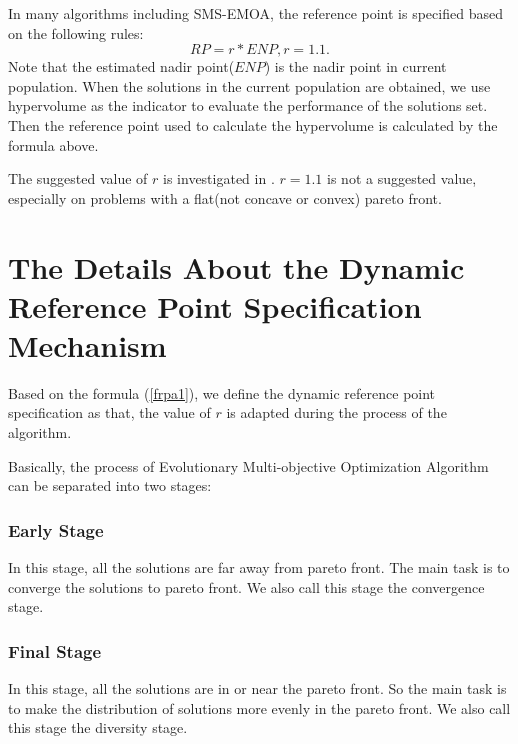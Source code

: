 \documentclass[conference]{IEEEtran}
\begin{document}
In many algorithms including SMS-EMOA\cite{smsemoa}, 
the reference point is specified based on the following rules:
\begin{equation}\label{frpa1}
  RP = r * ENP, r = 1.1.
\end{equation}
Note that the estimated nadir point($ENP$) is the nadir point in current population.
When the solutions in the current population are obtained, 
we use hypervolume as the indicator to evaluate the performance of the solutions set. 
Then the reference point used to calculate the hypervolume is calculated by the formula above.

The suggested value of $r$ is investigated in \cite{hisao:RPexplanation, hisao:RPhowtoSpecify, hisao:RPspecify}. 
$r=1.1$ is not a suggested value, especially on problems with a flat(not concave or convex) pareto front.

%
% 
\section{The Details About the Dynamic Reference Point Specification Mechanism}
Based on the formula (\ref{frpa1}), 
we define the dynamic reference point specification as that,
the value of $r$ is adapted during the process of the algorithm.

Basically, the process of Evolutionary Multi-objective Optimization Algorithm can be separated into
two stages:
\subsubsection{Early Stage} In this stage, 
all the solutions are far away from pareto front.
The main task is to converge the solutions to pareto front.
We also call this stage the convergence stage.
\subsubsection{Final Stage} In this stage,
all the solutions are in or near the pareto front.
So the main task is to make the distribution of solutions more evenly in the pareto front.
We also call this stage the diversity stage.
\end{document}
